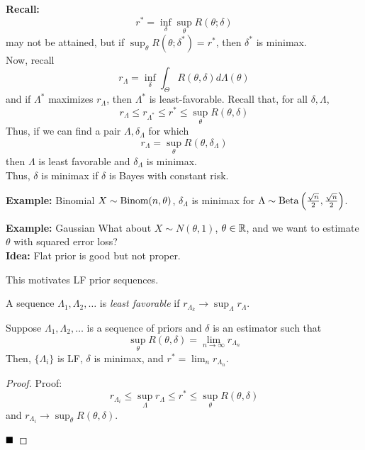 
\textbf{Recall:}
\[ r^{*} = \inf_{\delta}\sup_{\theta} R(\theta; \delta) \]
may not be attained, but if $\sup_{\theta} R(\theta; \delta^{*}) = r^{*}$, then $\delta^{*}$ is minimax.\\

Now, recall
\[ r_{\Lambda} = \inf_{\delta}\int_{\Theta} R(\theta, \delta) d\Lambda(\theta) \]
and if $\Lambda^{*}$ maximizes $r_{\Lambda}$, then $\Lambda^{*}$ is least-favorable. Recall that, for all $\delta, \Lambda$,
\[ r_{\Lambda} \leq r_{\Lambda^{*}} \leq r^{*} \leq \sup_{\theta} R(\theta, \delta) \]
Thus, if we can find a pair $\Lambda, \delta_{\Lambda}$ for which
\[ r_{\Lambda} = \sup_{\theta} R(\theta, \delta_{\Lambda}) \]
then $\Lambda$ is least favorable and $\delta_{\Lambda}$ is minimax.\\

Thus, $\delta$ is minimax if $\delta$ is Bayes with constant risk.

\begin{example}{\textbf{Example:} Binomial}
    $X \sim \Binom(n, \theta)$, $\delta_{\Lambda}$ is minimax for $\Lambda \sim \tt{Beta}\left(\frac{\sqrt{n}}{2}, \frac{\sqrt{n}}{2}\right)$.
\end{example}

\begin{example}{\textbf{Example:} Gaussian}
    What about $X \sim N(\theta, 1)$, $\theta \in \R$, and we want to estimate $\theta$ with squared error loss?\\

    \textbf{Idea:} Flat prior is good but not proper.
\end{example}

This motivates LF prior sequences.

\begin{definition}
    A sequence $\Lambda_1, \Lambda_2, \ldots$ is \emph{least favorable} if $r_{\Lambda_k} \to \sup_{\Lambda} r_{\Lambda}$.
\end{definition}

\begin{lemma}
    Suppose $\Lambda_1, \Lambda_2, \ldots$ is a sequence of priors and $\delta$ is an estimator such that
    \[ \sup_{\theta} R(\theta, \delta) = \lim_{n \to \infty} r_{\Lambda_n} \]
    Then, $\{\Lambda_i\}$ is LF, $\delta$ is minimax, and $r^{*} = \lim_{n} r_{\Lambda_n}$.
\end{lemma}
\begin{proof}{Proof:}
    \[ r_{\Lambda_i} \leq \sup_{\Lambda} r_{\Lambda}  \leq r^{*} \leq \sup_{\theta} R(\theta, \delta) \]
    and $r_{\Lambda_i} \to \sup_{\theta} R(\theta, \delta)$.

    $\qed$
\end{proof}


